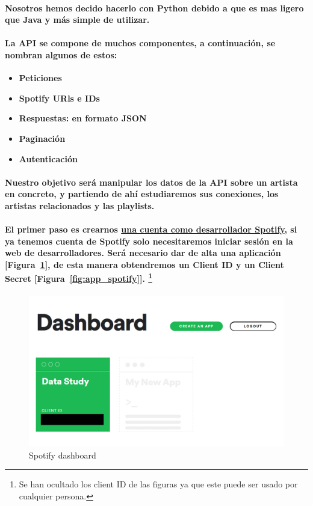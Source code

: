 \documentclass[11pt,spanish]{article}
\begin{document}
\paragraph*{Nosotros hemos decido hacerlo con Python debido a que es mas ligero que Java y más simple de utilizar.}

\paragraph*{La API se compone de muchos componentes, a continuación, se nombran algunos de estos:}

\begin{itemize}
	\item \textbf{Peticiones}
	\item \textbf{Spotify URls e IDs }
	\item \textbf{Respuestas: en formato JSON}
	\item \textbf{Paginación}
	\item \textbf{Autenticación }
\end{itemize}

\paragraph*{Nuestro objetivo será manipular los datos de la API sobre un artista en concreto, y partiendo de ahí estudiaremos sus conexiones, los artistas relacionados y las playlists.}

\paragraph*{El primer paso es crearnos \href{https://developer.spotify.com/dashboard/applications}{una cuenta como desarrollador Spotify}, 
	si ya tenemos cuenta de Spotify solo necesitaremos iniciar sesión en la web de desarrolladores. Será necesario dar de alta una aplicación [Figura~\ref{fig:dashboard_spotify}], de esta manera obtendremos un Client ID y un Client Secret [Figura~\ref{fig:app_spotify}].
	\footnote{Se han ocultado los client ID de las figuras ya que este puede ser usado por cualquier persona.}}

\begin{figure}[h!]
    \centering
    \includegraphics[width=120mm]{spotify_dev_dashboard.png}
    \caption{Spotify dashboard}\label{fig:dashboard_spotify}
\end{figure}
\end{document}
